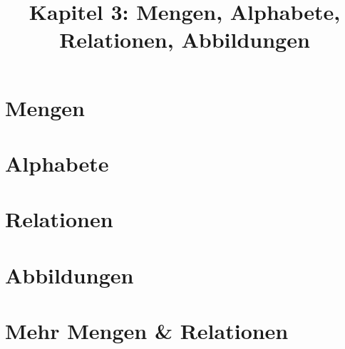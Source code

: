\documentclass[18pt]{beamer}
\title[Mengen, Alphabete...]{Kapitel 3: Mengen, Alphabete, Relationen, Abbildungen}
\begin{document}

\begin{frame}
 \titlepage
\end{frame}

\def\showSolutions{1}					 %

\section{Mengen}
\title[Mengen]{}

\section{Alphabete}
\title[Alphabete]{}

\section{Relationen}
\title[Relationen]{}

\section{Abbildungen}
\title[Abbildungen]{}

\section{Mehr Mengen & Relationen}
\title[Mehr Mengen & Relationen]{}

\end{document}
